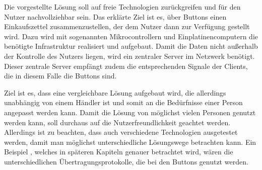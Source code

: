Die vorgestellte Lösung soll auf freie Technologien zurückgreifen und für den Nutzer nachvollziehbar sein. Das erklärte Ziel ist es, über Buttons einen Einkaufszettel zusammenzustellen, der dem Nutzer dann zur Verfügung gestellt wird. Dazu wird mit sogenannten Mikrocontrollern und Einplatinencomputern die benötigte Infrastruktur realisiert und aufgebaut. Damit die Daten nicht außerhalb der Kontrolle des Nutzers liegen, wird ein zentraler Server im Netzwerk benötigt. Dieser zentrale Server empfängt zudem die entsprechenden Signale der Clients, die in diesem Falle die Buttons sind. 

Ziel ist es, dass eine vergleichbare Lösung aufgebaut wird, die allerdings unabhängig von einem Händler ist und somit an die Bedürfnisse einer Person angepasst werden kann. Damit die Lösung von möglichst vielen Personen genutzt werden kann, soll durchaus auf die Nutzerfreundlichkeit geachtet werden. Allerdings ist zu beachten, dass auch verschiedene Technologien ausgetestet werden, damit man möglichst unterschiedliche Lösungswege betrachten kann. Ein Beispiel , welches in späteren Kapiteln genauer betrachtet wird, wären die unterschiedlichen Übertragungsprotokolle, die bei den Buttons genutzt werden.